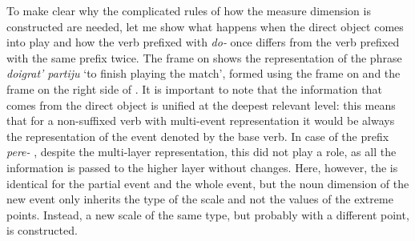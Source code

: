 To make clear why the complicated rules of how the measure dimension is constructed are needed, let me show what happens when the direct object comes into play and how the verb prefixed with \textit{do-}   once differs from the verb prefixed with the same prefix twice. The frame on  shows the representation of the phrase \textit{doigrat' partiju} `to finish playing the match', formed using the frame on  and the frame on the right side of . It is important to note that the information that comes from the direct object is unified at the deepest relevant level: this means that for a non-suffixed verb with multi-event representation it would be always the representation of the event denoted by the base verb. In case of the prefix \textit{pere-}  , despite the multi-layer representation, this did not play a role, as all the information is passed to the higher layer without changes. Here, however, the \THEME is identical for the partial event and the whole event, but the noun dimension of the new event only inherits the type of the scale and not the values of the extreme points. Instead, a new scale of the same type, but probably with a different \MIN point, is constructed.

